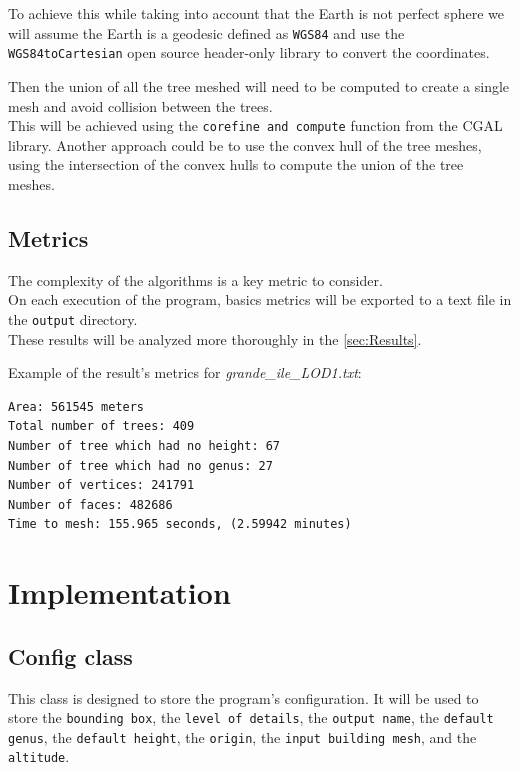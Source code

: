 \documentclass[12pt]{article}
\begin{document}
To achieve this while taking into account that the Earth is not perfect sphere
we will assume the Earth is a geodesic defined as \texttt{WGS84}\cite{wgs84} and use
the \texttt{WGS84toCartesian}\cite{wgs84_to_cartesian} open source header-only
library to convert the coordinates.

Then the union of all the tree meshed will need to be computed to create a single mesh
and avoid collision between the trees. \\
This will be achieved using the \texttt{corefine and compute}\cite{corefine-compute}
function from the CGAL library.
Another approach could be to use the convex hull of the tree meshes, using the
intersection of the convex hulls to compute the union of the tree meshes.

\subsection{Metrics}
The complexity of the algorithms is a key metric to consider. \\
On each execution of the program, basics metrics will be exported to a text file in
the \texttt{output} directory. \\
These results will be analyzed more thoroughly in the \autoref{sec:Results}.

Example of the result's metrics for \textit{grande\_ile\_LOD1.txt}:

\begin{lstlisting}
Area: 561545 meters
Total number of trees: 409
Number of tree which had no height: 67
Number of tree which had no genus: 27
Number of vertices: 241791
Number of faces: 482686
Time to mesh: 155.965 seconds, (2.59942 minutes)
\end{lstlisting}

\newpage

\section{Implementation}

\subsection{Config class}

This class is designed to store the program's configuration. It will be used to
store the \texttt{bounding box}, the \texttt{level of details}, the \texttt{output name},
the \texttt{default genus}, the \texttt{default height}, the \texttt{origin}, the
\texttt{input building mesh}, and the \texttt{altitude}.
\end{document}

